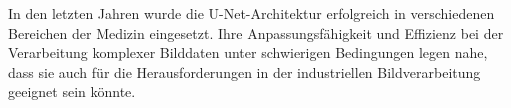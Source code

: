 In den letzten Jahren wurde die U-Net-Architektur erfolgreich in verschiedenen Bereichen der Medizin eingesetzt\cite{azad_medical_2024,siddique_u-net_2021}. Ihre Anpassungsfähigkeit und Effizienz bei der Verarbeitung komplexer Bilddaten unter schwierigen Bedingungen legen nahe, dass sie auch für die Herausforderungen in der industriellen Bildverarbeitung geeignet sein könnte.
